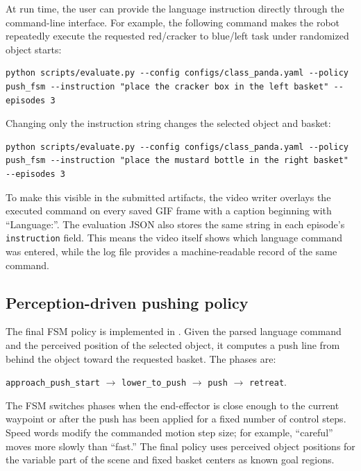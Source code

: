 \documentclass{article}
\begin{document}
At run time, the user can provide the language instruction directly through the command-line interface. For example, the following command makes the robot repeatedly execute the requested red/cracker to blue/left task under randomized object starts:

\begin{lstlisting}[style=cmd]
python scripts/evaluate.py --config configs/class_panda.yaml --policy push_fsm --instruction "place the cracker box in the left basket" --episodes 3
\end{lstlisting}

Changing only the instruction string changes the selected object and basket:

\begin{lstlisting}[style=cmd]
python scripts/evaluate.py --config configs/class_panda.yaml --policy push_fsm --instruction "place the mustard bottle in the right basket" --episodes 3
\end{lstlisting}

To make this visible in the submitted artifacts, the video writer overlays the executed command on every saved GIF frame with a caption beginning with ``Language:''. The evaluation JSON also stores the same string in each episode's \texttt{instruction} field. This means the video itself shows which language command was entered, while the log file provides a machine-readable record of the same command.

\subsection{Perception-driven pushing policy}

The final FSM policy is implemented in . Given the parsed language command and the perceived position of the selected object, it computes a push line from behind the object toward the requested basket. The phases are:

\begin{center}
\texttt{approach\_push\_start} $\rightarrow$ \texttt{lower\_to\_push} $\rightarrow$ \texttt{push} $\rightarrow$ \texttt{retreat}.
\end{center}

The FSM switches phases when the end-effector is close enough to the current waypoint or after the push has been applied for a fixed number of control steps. Speed words modify the commanded motion step size; for example, ``careful'' moves more slowly than ``fast.'' The final policy uses perceived object positions for the variable part of the scene and fixed basket centers as known goal regions.
\end{document}
